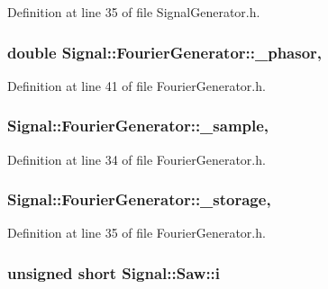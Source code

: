 Definition at line 35 of file Signal\+Generator.\+h.

\hypertarget{classSignal_1_1FourierGenerator_a72d24f45a30cd143508ce7eb753f4436}{
\subsubsection[{\+\_\+phasor}]{\setlength{\rightskip}{0pt plus 5cm}double Signal\+::\+Fourier\+Generator\+::\+\_\+phasor\hspace{0.3cm}{\ttfamily [protected]}, {\ttfamily [inherited]}}}\label{classSignal_1_1FourierGenerator_a72d24f45a30cd143508ce7eb753f4436}


Definition at line 41 of file Fourier\+Generator.\+h.

\hypertarget{classSignal_1_1FourierGenerator_a78c37a66bf33a2fda3c9e92478ad418c}{
\subsubsection[{\+\_\+sample}]{ Signal\+::\+Fourier\+Generator\+::\+\_\+sample\hspace{0.3cm}{\ttfamily [protected]}, {\ttfamily [inherited]}}}\label{classSignal_1_1FourierGenerator_a78c37a66bf33a2fda3c9e92478ad418c}


Definition at line 34 of file Fourier\+Generator.\+h.

\hypertarget{classSignal_1_1FourierGenerator_af7ad42ccb202fba6c0fb1ec653c5cb36}{
\subsubsection[{\+\_\+storage}]{ Signal\+::\+Fourier\+Generator\+::\+\_\+storage\hspace{0.3cm}{\ttfamily [protected]}, {\ttfamily [inherited]}}}\label{classSignal_1_1FourierGenerator_af7ad42ccb202fba6c0fb1ec653c5cb36}


Definition at line 35 of file Fourier\+Generator.\+h.

\hypertarget{classSignal_1_1Saw_a50612c8009e428dccb3e4b3b798bdf3d}{
\subsubsection[{i}]{\setlength{\rightskip}{0pt plus 5cm}unsigned short Signal\+::\+Saw\+::i\hspace{0.3cm}{\ttfamily [protected]}}}\label{classSignal_1_1Saw_a50612c8009e428dccb3e4b3b798bdf3d}


